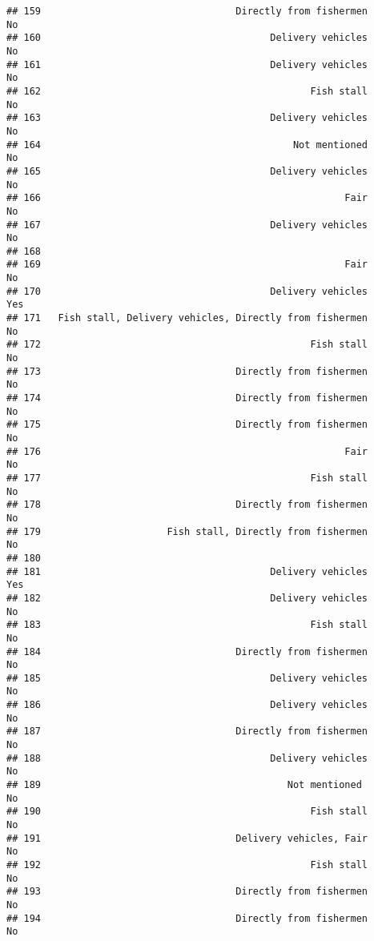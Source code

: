 \documentclass[
]{article}
\begin{document}
\begin{verbatim}
## 159                                  Directly from fishermen        No
## 160                                        Delivery vehicles        No
## 161                                        Delivery vehicles        No
## 162                                               Fish stall        No
## 163                                        Delivery vehicles        No
## 164                                            Not mentioned        No
## 165                                        Delivery vehicles        No
## 166                                                     Fair        No
## 167                                        Delivery vehicles        No
## 168                                                                   
## 169                                                     Fair        No
## 170                                        Delivery vehicles       Yes
## 171   Fish stall, Delivery vehicles, Directly from fishermen        No
## 172                                               Fish stall        No
## 173                                  Directly from fishermen        No
## 174                                  Directly from fishermen        No
## 175                                  Directly from fishermen        No
## 176                                                     Fair        No
## 177                                               Fish stall        No
## 178                                  Directly from fishermen        No
## 179                      Fish stall, Directly from fishermen        No
## 180                                                                   
## 181                                        Delivery vehicles       Yes
## 182                                        Delivery vehicles        No
## 183                                               Fish stall        No
## 184                                  Directly from fishermen        No
## 185                                        Delivery vehicles        No
## 186                                        Delivery vehicles        No
## 187                                  Directly from fishermen        No
## 188                                        Delivery vehicles        No
## 189                                           Not mentioned         No
## 190                                               Fish stall        No
## 191                                  Delivery vehicles, Fair        No
## 192                                               Fish stall        No
## 193                                  Directly from fishermen        No
## 194                                  Directly from fishermen        No

\end{verbatim}
\end{document}
